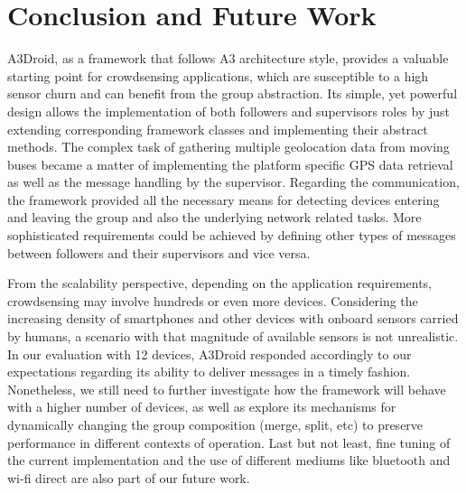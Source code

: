 \section{Conclusion and Future Work}
\label{sec:conclusion}


A3Droid, as a framework that follows A3 architecture style, provides a valuable starting point for crowdsensing applications, which are susceptible to a high sensor churn and can benefit from the group abstraction. Its simple, yet powerful design allows the implementation of both followers and supervisors roles by just extending corresponding framework classes and implementing their abstract methods. The complex task of gathering multiple geolocation data from moving buses became a matter of implementing the platform specific GPS data retrieval as well as the message handling by the supervisor. Regarding the communication, the framework provided all the necessary means for detecting devices entering and leaving the group and also the underlying network related tasks. More sophisticated requirements could be achieved by defining other types of messages between followers and their supervisors and vice versa.

From the scalability perspective, depending on the application requirements, crowdsensing may involve hundreds or even more devices. Considering the increasing density of smartphones and other devices with onboard sensors carried by humans, a scenario with that magnitude of available sensors is not unrealistic. In our evaluation with 12 devices, A3Droid responded accordingly to our expectations regarding its ability to deliver messages in a timely fashion. Nonetheless, we still need to further investigate how the framework will behave with a higher number of devices, as well as explore its mechanisms for dynamically changing the group composition (merge, split, etc) to preserve performance in different contexts of operation. Last but not least, fine tuning of the current implementation and the use of different mediums like bluetooth and wi-fi direct are also part of our future work.